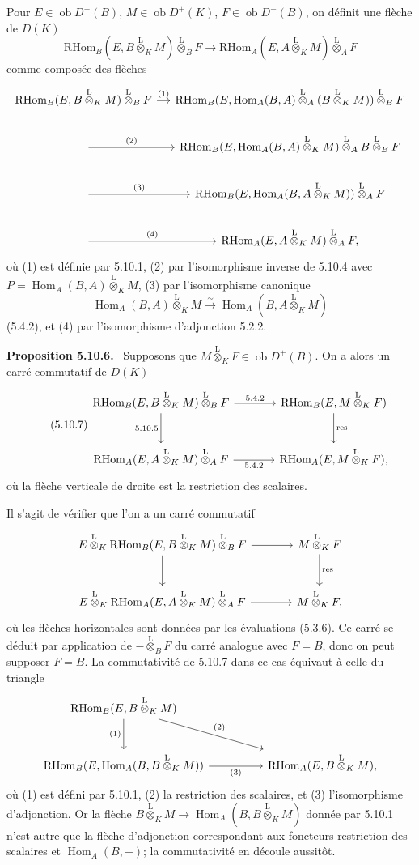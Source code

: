 \documentclass[11pt]{article}
\newenvironment{statement}[1]{\par\medskip\noindent\textbf{#1.}\ }{\par\medskip}
\DeclareMathOperator{\Hom}{Hom}
\newcommand{\ob}{\operatorname{ob}}
\providecommand{\RHom}{\mathrm{RHom}}
\providecommand{\lten}{\overset{\mathrm L}{\otimes}}
\providecommand{\RHom}{\mathrm{RHom}}
\providecommand{\Hom}{\operatorname{Hom}}
\providecommand{\ob}{\operatorname{ob}}
\providecommand{\lten}{\overset{\mathrm L}{\otimes}}
\providecommand{\RHom}{\mathrm R\mathcal{H}om}
\providecommand{\lten}{\overset{\mathrm L}{\otimes}}
\providecommand{\lten}{\overset{\mathrm L}{\otimes}}
\providecommand{\lten}{\overset{\mathrm L}{\otimes}}
\providecommand{\lten}{\overset{\mathrm L}{\otimes}}
\providecommand{\RHom}{\mathrm{RHom}}
\providecommand{\Hom}{\operatorname{Hom}}
\providecommand{\lten}{\overset{\mathrm L}{\otimes}}
\begin{document}
Pour $E\in\ob D^-(B)$, $M\in\ob D^+(K)$, $F\in\ob D^-(B)$, on définit une flèche de $D(K)$
\begin{equation}\tag{5.10.5}
\RHom_B(E,B\lten_KM)\lten_BF\longrightarrow\RHom_A(E,A\lten_KM)\lten_AF
\end{equation}
comme composée des flèches
\[
\begin{tikzcd}[column sep=small]
\RHom_B(E,B\lten_KM)\lten_BF \arrow[r,"(1)"] & \RHom_B(E,\Hom_A(B,A)\lten_A(B\lten_KM))\lten_BF \\
\arrow[r,"(2)"] & \RHom_B(E,\Hom_A(B,A)\lten_KM)\lten_A B\lten_BF \\
\arrow[r,"(3)"] & \RHom_B(E,\Hom_A(B,A\lten_KM))\lten_AF \\
\arrow[r,"(4)"] & \RHom_A(E,A\lten_KM)\lten_AF,
\end{tikzcd}
\]
où (1) est définie par 5.10.1, (2) par l'isomorphisme inverse de 5.10.4 avec $P=\Hom_A(B,A)\lten_KM$, (3) par l'isomorphisme canonique
\[
\Hom_A(B,A)\lten_KM\xrightarrow{\sim}\Hom_A(B,A\lten_KM)
\]
(5.4.2), et (4) par l'isomorphisme d'adjonction 5.2.2.

\begin{statement}{Proposition 5.10.6}
Supposons que $M\lten_KF\in\ob D^+(B)$. On a alors un carré commutatif de $D(K)$
\begin{equation}\tag{5.10.7}
\begin{tikzcd}[column sep=large,row sep=large]
\RHom_B(E,B\lten_KM)\lten_BF \arrow[r,"5.4.2"] \arrow[d,"5.10.5"'] & \RHom_B(E,M\lten_KF) \arrow[d,"\mathrm{res}"]\\
\RHom_A(E,A\lten_KM)\lten_AF \arrow[r,"5.4.2"'] & \RHom_A(E,M\lten_KF),
\end{tikzcd}
\end{equation}
où la flèche verticale de droite est la restriction des scalaires.
\end{statement}

Il s'agit de vérifier que l'on a un carré commutatif
\[
\begin{tikzcd}[column sep=large,row sep=large]
E\lten_K\RHom_B(E,B\lten_KM)\lten_BF \arrow[r] \arrow[d] & M\lten_KF \arrow[d,"\mathrm{res}"]\\
E\lten_K\RHom_A(E,A\lten_KM)\lten_AF \arrow[r] & M\lten_KF,
\end{tikzcd}
\]
où les flèches horizontales sont données par les évaluations (5.3.6). Ce carré se déduit par application de $-\lten_BF$ du carré analogue avec $F=B$, donc on peut supposer $F=B$. La commutativité de 5.10.7 dans ce cas équivaut à celle du triangle
\[
\begin{tikzcd}[column sep=huge,row sep=large]
\RHom_B(E,B\lten_KM) \arrow[d,"(1)"'] \arrow[dr,"(2)"] & \\
\RHom_B(E,\Hom_A(B,B\lten_KM)) \arrow[r,"(3)"'] & \RHom_A(E,B\lten_KM),
\end{tikzcd}
\]
où (1) est défini par 5.10.1, (2) la restriction des scalaires, et (3) l'isomorphisme d'adjonction. Or la flèche $B\lten_KM\to\Hom_A(B,B\lten_KM)$ donnée par 5.10.1 n'est autre que la flèche d'adjonction correspondant aux foncteurs restriction des scalaires et $\Hom_A(B,-)$; la commutativité en découle aussitôt.
\end{document}
